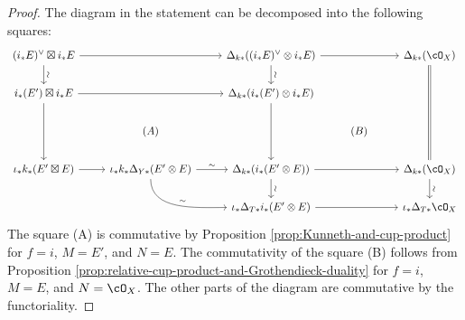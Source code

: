 \documentclass{amsart}
\numberwithin{equation}{section}
\theoremstyle{plain}
\theoremstyle{definition}
\begin{document}
\begin{proof}
    The diagram in the statement can be decomposed into the following squares:
    \[
        \begin{tikzcd}
            (i_*E)^\vee \boxtimes i_*E \ar[rr]\ar[d, "\sim", sloped] &  & \Delta_{k*}((i_*E)^\vee \otimes i_*E) \ar[rr]\ar[d, "\sim", sloped] &  & \Delta_{k*}(\cO_X) \ar[ddd, equal]\\
            i_*(E')\boxtimes i_*E \ar[rr]\ar[dd]&  & \Delta_{k*}(i_*(E')\otimes i_*E) \ar[dd] &  & \\
            & (A) &  & (B) & \\
            \iota_*k_*(E' \boxtimes E) \ar[r] & \iota_*k_*\Delta_{Y*}(E' \otimes E) \ar[r, "\sim"]\ar[rd, out=-90, in=180, "\sim"] & \Delta_{k*}(i_*(E' \otimes E)) \ar[rr]\ar[d, "\sim", sloped] &  & \Delta_{k*}(\cO_X) \ar[d, "\sim", sloped] \\
            &  & \iota_*\Delta_{T*}i_*(E' \otimes E) \ar[rr] &  & \iota_*\Delta_{T*}\cO_X
        \end{tikzcd}
    \]
    The square (A) is commutative by Proposition \ref{prop:Kunneth-and-cup-product} for $f = i$, $M = E'$, and $N = E$.
    The commutativity of the square (B) follows from Proposition \ref{prop:relative-cup-product-and-Grothendieck-duality} for $f = i$, $M = E$, and $N = \cO_X$.
    The other parts of the diagram are commutative by the functoriality.
\end{proof}
\end{document}
